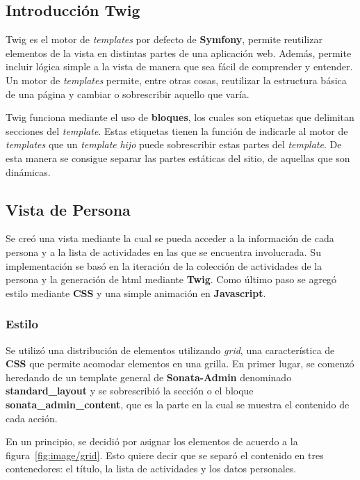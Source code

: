 \subsection{Introducción Twig}%
\label{sub:introducción_twig}

Twig es el motor de \textit{templates} por defecto de \textbf{Symfony}, permite reutilizar elementos de la vista en distintas partes de una aplicación web\@. Además, permite incluir lógica simple a la
vista de manera que sea fácil de comprender y entender\@. Un motor de \textit{templates} permite, entre otras cosas, reutilizar la estructura básica de una página y cambiar o sobrescribir
aquello que varía.

Twig funciona mediante el uso de \textbf{bloques}, los cuales son etiquetas que delimitan secciones del \textit{template}\@. Estas etiquetas tienen la función de indicarle al motor de \textit{templates}
que un \textit{template} \textit{hijo} puede sobrescribir estas partes del \textit{template}\@. De esta manera se consigue separar las partes estáticas del sitio, de aquellas que son dinámicas.


\subsection{Vista de Persona}
\label{sub:vista_persona}
Se creó una vista mediante la cual se pueda acceder a la información de cada persona y a la lista de actividades en las que se encuentra involucrada. Su
implementación se basó en la iteración de la colección de actividades  de la persona y la generación de html mediante \textbf{Twig}\@.
Como último paso se agregó estilo mediante \textbf{CSS} y una simple animación en \textbf{Javascript}.


\subsubsection{Estilo}%
\label{ssub:estilo}

Se utilizó una distribución de elementos utilizando \textit{grid}, una característica de \textbf{CSS} que permite acomodar elementos en una grilla\@. En primer lugar, se comenzó heredando de un template
general de \textbf{Sonata-Admin} denominado \textbf{standard\_layout} y se sobrescribió la sección o el bloque \textbf{sonata\_admin\_content}, que es la parte en la cual se muestra el contenido de cada
acción.



En un principio, se decidió por asignar los elementos de acuerdo a la figura~\ref{fig:image/grid}. Esto quiere decir que se separó el contenido en tres contenedores: el título, la lista de actividades y
los datos personales.


